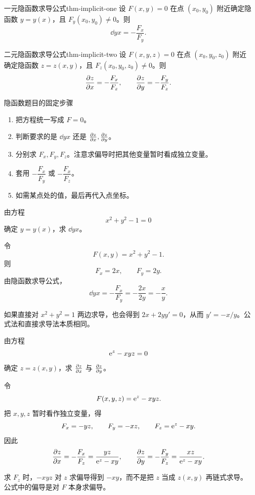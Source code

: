 \begin{dl}{一元隐函数求导公式}{thm-implicit-one}
设 $F(x,y)=0$ 在点 $(x_0,y_0)$ 附近确定隐函数 $y=y(x)$，且 $F_y(x_0,y_0)\ne0$。则
\[
  \dd{y}{x}=-\frac{F_x}{F_y}.
\]
\end{dl}

\begin{dl}{二元隐函数求导公式}{thm-implicit-two}
设 $F(x,y,z)=0$ 在点 $(x_0,y_0,z_0)$ 附近确定隐函数 $z=z(x,y)$，且 $F_z(x_0,y_0,z_0)\ne0$。则
\[
  \frac{\partial z}{\partial x}=-\frac{F_x}{F_z},\qquad
  \frac{\partial z}{\partial y}=-\frac{F_y}{F_z}.
\]
\end{dl}

\begin{methodbox}{隐函数题目的固定步骤}
\begin{enumerate}
  \item 把方程统一写成 $F=0$。
  \item 判断要求的是 $\dd{y}{x}$ 还是 $\frac{\partial z}{\partial x},\frac{\partial z}{\partial y}$。
  \item 分别求 $F_x,F_y,F_z$。注意求偏导时把其他变量暂时看成独立变量。
  \item 套用 $-\dfrac{F_x}{F_y}$ 或 $-\dfrac{F_x}{F_z}$。
  \item 如需某点处的值，最后再代入点坐标。
\end{enumerate}
\end{methodbox}

\begin{problem}
由方程
\[
  x^2+y^2-1=0
\]
确定 $y=y(x)$，求 $\dd{y}{x}$。
\end{problem}
\begin{solution}
令
\[
  F(x,y)=x^2+y^2-1.
\]
则
\[
  F_x=2x,\qquad F_y=2y.
\]
由隐函数求导公式，
\[
  \dd{y}{x}=-\frac{F_x}{F_y}=-\frac{2x}{2y}=-\frac{x}{y}.
\]
\end{solution}
\begin{note}
如果直接对 $x^2+y^2=1$ 两边求导，也会得到 $2x+2yy'=0$，从而 $y'=-x/y$。公式法和直接求导法本质相同。
\end{note}

\begin{problem}
由方程
\[
  \mathrm{e}^z-xyz=0
\]
确定 $z=z(x,y)$，求 $\frac{\partial z}{\partial x}$ 与 $\frac{\partial z}{\partial y}$。
\end{problem}
\begin{solution}
令
\[
  F(x,y,z)=\mathrm{e}^z-xyz.
\]
把 $x,y,z$ 暂时看作独立变量，得
\[
  F_x=-yz,\qquad F_y=-xz,\qquad F_z=\mathrm{e}^z-xy.
\]
因此
\[
  \frac{\partial z}{\partial x}=-\frac{F_x}{F_z}
  =\frac{yz}{\mathrm{e}^z-xy},
  \qquad
  \frac{\partial z}{\partial y}=-\frac{F_y}{F_z}
  =\frac{xz}{\mathrm{e}^z-xy}.
\]
\end{solution}
\begin{note}
求 $F_z$ 时，$-xyz$ 对 $z$ 求偏导得到 $-xy$，而不是把 $z$ 当成 $z(x,y)$ 再链式求导。公式中的偏导是对 $F$ 本身求偏导。
\end{note}

